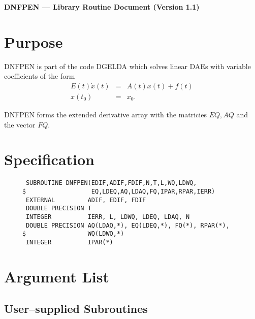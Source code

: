 


\begin{center}
  {\bf DNFPEN --- Library Routine Document (Version 1.1)}
\end{center}

\section{Purpose}

DNFPEN is part of the code DGELDA \cite{KunMRW95} which solves linear
DAEs with variable coefficients of the form
\begin{eqnarray*}
  E(t)\dot{x}(t) &=& A(t)x(t) + f(t)\\
  x(t_0) &=& x_0.
\end{eqnarray*}

DNFPEN forms the extended derivative array with the matricies $EQ, AQ$
and the vector $FQ$.

\section{Specification}

\begin{verbatim}
      SUBROUTINE DNFPEN(EDIF,ADIF,FDIF,N,T,L,WQ,LDWQ,
     $                  EQ,LDEQ,AQ,LDAQ,FQ,IPAR,RPAR,IERR)
      EXTERNAL         ADIF, EDIF, FDIF
      DOUBLE PRECISION T
      INTEGER          IERR, L, LDWQ, LDEQ, LDAQ, N
      DOUBLE PRECISION AQ(LDAQ,*), EQ(LDEQ,*), FQ(*), RPAR(*),
     $                 WQ(LDWQ,*)
      INTEGER          IPAR(*)
\end{verbatim}

\section{Argument List}

\subsection{User--supplied Subroutines}

